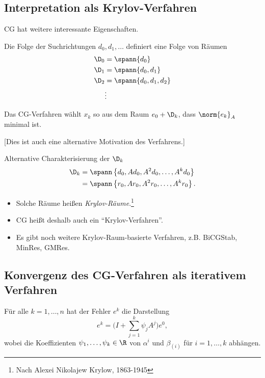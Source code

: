 \subsection{Interpretation als Krylov-Verfahren}
CG hat weitere interessante Eigenschaften.

Die Folge der Suchrichtungen $d_0, d_1, \dots$ definiert eine Folge von Räumen
\begin{align*}
 \D_0 & =\spann \{d_0\} \\
 \D_1 & =\spann \{d_0,d_1\} \\
 \D_2 & =\spann \{d_0,d_1,d_2\} \\
 & \vdots
\end{align*}
\begin{satz}
Das CG-Verfahren wählt $x_k$ so aus dem Raum $e_0+\D_k$, dass $\norm{e_k}_A$ minimal ist.
\end{satz}

[Dies ist auch eine alternative Motivation des Verfahrens.]

\bigskip

Alternative Charakterisierung der $\D_k$
\begin{align*}
	\D_k & =\spann \left\lbrace d_0,Ad_0,A^2d_0,\ldots,A^kd_0 \right\rbrace \\
	& =\spann \left\lbrace r_0,Ar_0,A^2r_0,\ldots,A^kr_0 \right\rbrace.
\end{align*}

\begin{itemize}
 \item Solche Räume heißen \emph{Krylov-Räume}.\footnote{Nach Alexei Nikolajew Krylow, 1863-1945}
 \item CG heißt deshalb auch ein "`Krylov-Verfahren"'.
 \item Es gibt noch weitere Krylov-Raum-basierte Verfahren, z.B. BiCGStab, MinRes, GMRes.
\end{itemize}

\subsection{Konvergenz des CG-Verfahren als iterativem Verfahren}
\begin{satz}
Für alle $k=1,\ldots,n$ hat der Fehler $e^k$ die Darstellung
\begin{equation*}
 e^k=\bigg(I+\sum_{j=1}^k \psi_jA^j \bigg)e^0,
\end{equation*}
wobei die Koeffizienten $\psi_1,\ldots,\psi_k \in \R$ von $\alpha^i$ und $\beta_{(i)}$ für $i=1,\ldots,k$ abhängen.
\end{satz}

